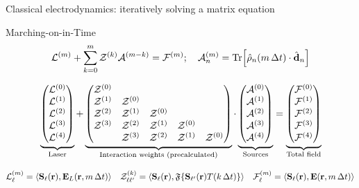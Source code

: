 \documentclass[aspectratio=169]{beamer}
\newcommand{\oper}[1]{\mathcal{#1}}
\begin{document}
\begin{frame}{Classical electrodynamics: iteratively solving a matrix equation}
  \begin{block}{Marching-on-in-Time}
    \begin{equation*}
    \oper{L}^{(m)} + \sum_{k = 0}^m \oper{Z}^{(k)} \oper{A}^{(m-k)} = \oper{F}^{(m)}; \quad \oper{A}^{(m)}_n = \Trace\!\qty[\hat{\rho}_n(m \, \Delta t) \cdot \hat{\vb{d}}_n]
    \end{equation*}
  \end{block}

  \vspace{-0.5cm}
  \begin{equation*}
    \underbrace{\mqty(\oper{L}^{(0)} \\ \oper{L}^{(1)} \\ \oper{L}^{(2)} \\ \oper{L}^{(3)} \\ \oper{L}^{(4)})}_\text{Laser} +
    \underbrace{\mqty(
      \oper{Z}^{(0)} \\
      \oper{Z}^{(1)} & \oper{Z}^{(0)} \\
      \oper{Z}^{(2)} & \oper{Z}^{(1)} & \oper{Z}^{(0)} \\
      \oper{Z}^{(3)} & \oper{Z}^{(2)} & \oper{Z}^{(1)} & \oper{Z}^{(0)} \\
                                & \oper{Z}^{(3)} & \oper{Z}^{(2)} & \oper{Z}^{(1)} & \oper{Z}^{(0)} \\
      )}_\text{Interaction weights (precalculated)} \cdot
    \underbrace{\mqty(\oper{A}^{(0)} \\ \oper{A}^{(1)} \\ \oper{A}^{(2)} \\ \oper{A}^{(3)} \\ \oper{A}^{(4)})}_\text{Sources} =
    \underbrace{\mqty(\oper{F}^{(0)} \\ \oper{F}^{(1)} \\ \oper{F}^{(2)} \\ \oper{F}^{(3)} \\ \oper{F}^{(4)})}_\text{Total field}
  \end{equation*}

  \begin{equation*}
    \oper{L}^{(m)}_\ell = \langle\vb{S}_\ell(\vb{r}), \vb{E}_L (\vb{r}, m\, \Delta t)\rangle \quad
    \oper{Z}^{(k)}_{\ell\ell'} = \langle\vb{S}_\ell(\vb{r}), \mathfrak{F}\qty{\vb{S}_{\ell'}(\vb{r})T(k \, \Delta t)}\rangle \quad
    \oper{F}^{(m)}_\ell = \langle\vb{S}_\ell(\vb{r}), \vb{E} (\vb{r}, m\, \Delta t)\rangle
  \end{equation*}
\end{frame}
\end{document}
